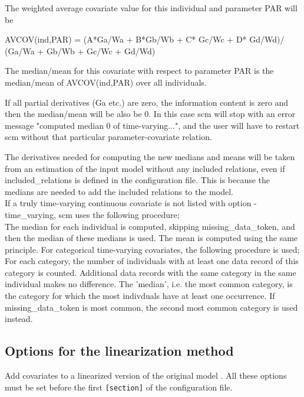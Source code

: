 \begin{optionlist}
The weighted average covariate value for this individual and parameter PAR will be
	
AVCOV(ind,PAR) = (A*Ga/Wa + B*Gb/Wb + C* Gc/Wc + D* Gd/Wd)/
(Ga/Wa + Gb/Wb + Gc/Wc + Gd/Wd)
	
The median/mean for this covariate with respect to parameter PAR is the median/mean of AVCOV(ind,PAR) over all individuals.
	
If all partial derivatives (Ga etc.) are zero, the information content is zero and then the median/mean will be also be 0.
In this case scm will stop with an error message "computed median 0 of time-varying...", and the user will have to restart scm without that particular parameter-covariate relation.
	
The derivatives needed for computing the new medians and means will be taken from an estimation of the input model without any included relations, even if included\_relations is defined in the configuration file. This is because the medians are needed to add the included relations to the model.\\
	

	
If a truly time-varying continuous covariate is not listed with option -time\_varying, scm uses the following procedure;\\
The median for each individual is computed, skipping missing\_data\_token, and then the median of these medians is used. The mean is computed using the same principle. For categorical time-varying covariates, the following procedure is used;
For each category, the number of individuals with at least one data record of this category is counted. Additional data records with the same category in the same individual makes no difference. The 'median', i.e. the most common category, is the category for which the most indivduals have at least one occurrence. If missing\_data\_token is most common, the second most common category is used instead.
\nextopt
\end{optionlist}

\subsection{Options for the linearization method}

Add covariates to a linearized version of the  original model \cite{Khandelwal}. All these options must be set before the first \verb|[section]| of the configuration file. 

